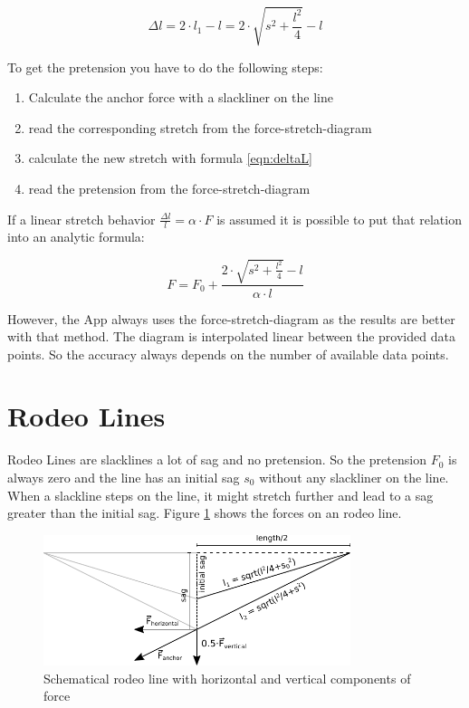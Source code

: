 \begin{equation}
	\Delta l = 2\cdot l_1 - l= 2\cdot \sqrt{s^2+\frac{l^2}{4}} - l
	\label{eqn:deltaL}
\end{equation}

To get the pretension you have to do the following steps:

\begin{enumerate}
	\item Calculate the anchor force with a slackliner on the line
	\item read the corresponding stretch from the force-stretch-diagram
	\item calculate the new stretch with formula \ref{eqn:deltaL}
	\item read the pretension from the force-stretch-diagram
\end{enumerate}

If a linear stretch behavior $\frac{\Delta l}{l} = \alpha\cdot F$ is assumed it is possible to put that relation into an analytic formula:

\begin{equation}
	F = F_0 + \frac{2\cdot \sqrt{s^2+\frac{l^2}{4}} - l}{\alpha\cdot l}
\end{equation}

However, the App always uses the force-stretch-diagram as the results are better with that method. The diagram is interpolated linear between the provided data points. So the accuracy always depends on the number of available data points.

\section{Rodeo Lines}

Rodeo Lines are slacklines a lot of sag and no pretension. So the pretension $F_0$ is always zero and the line has an initial sag $s_0$ without any slackliner on the line. When a slackline steps on the line, it might stretch further and lead to a sag greater than the initial sag. Figure \ref{fig:RodeoLineWithForces} shows the forces on an rodeo line.

\begin{figure}[htb] \centering
	\includegraphics[width=0.8\textwidth]{images/rodeoLineWithForces.pdf}
	\caption{Schematical rodeo line with horizontal and vertical components of force}
	\label{fig:RodeoLineWithForces}
\end{figure}

